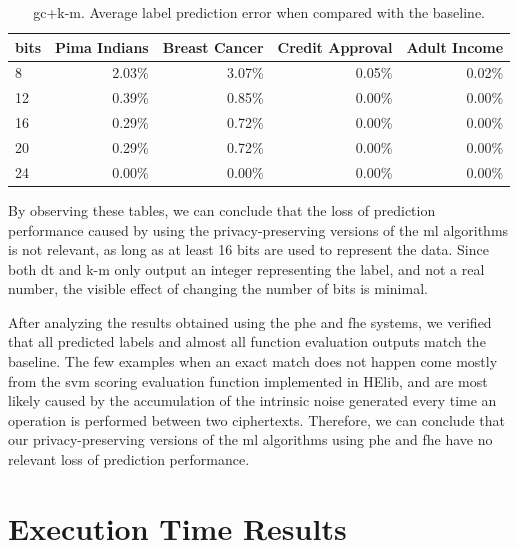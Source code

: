 \begin{table}[htp]
\centering
\caption{\acs{gc}+\acs{k-m}. Average label prediction error when compared with the baseline.}
\label{table:avgErrorKM}
\vspace*{0.2cm}
\begin{tabular}{|l|r|r|r|r|}
\hline
\textbf{bits} & \textbf{Pima Indians} & \textbf{Breast Cancer} & \textbf{Credit Approval} & \textbf{Adult Income} \\ \hline
8    & 2.03\%       & 3.07\%        &    0.05\%       &     0.02\%   \\ \hline
12   & 0.39\%       & 0.85\%        &    0.00\%       &     0.00\%   \\ \hline
16   & 0.29\%       & 0.72\%        &    0.00\%       &     0.00\%   \\ \hline
20   & 0.29\%       & 0.72\%        &    0.00\%       &     0.00\%   \\ \hline
24   & 0.00\%       & 0.00\%        &    0.00\%       &     0.00\%   \\ \hline
\end{tabular}
\end{table}

By observing these tables, we can conclude that the loss of prediction performance caused by using the privacy-preserving versions of the \ac{ml} algorithms is not relevant, as long as at least 16 bits are used to represent the data. Since both \ac{dt} and \ac{k-m} only output an integer representing the label, and not a real number, the visible effect of changing the number of bits is minimal.

After analyzing the results obtained using the \ac{phe} and \ac{fhe} systems, we verified that all predicted labels and almost all function evaluation outputs match the baseline. The few examples when an exact match does not happen come mostly from the \ac{svm} scoring evaluation function implemented in HElib, and are most likely caused by the accumulation of the intrinsic noise generated every time an operation is performed between two ciphertexts. Therefore, we can conclude that our privacy-preserving versions of the \ac{ml} algorithms using \ac{phe} and \ac{fhe} have no relevant loss of prediction performance.

\section{Execution Time Results}
\label{sec:ExperimentalResultsExecutionTime}

